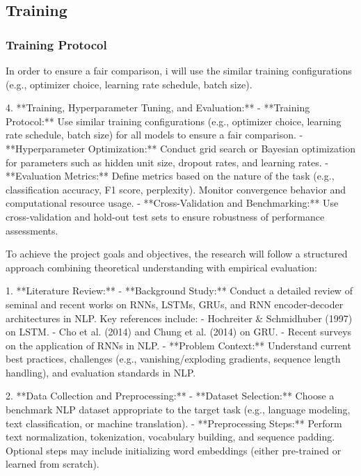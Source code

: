 \documentclass[12pt,a4paper]{article}
\begin{document}
\subsection{Training}
\subsubsection{Training Protocol}
In order to ensure a fair comparison, i will use the similar training configurations (e.g., optimizer choice, learning rate schedule, batch size). 



4. **Training, Hyperparameter Tuning, and Evaluation:**
   - **Training Protocol:**  
     Use similar training configurations (e.g., optimizer choice, learning rate schedule, batch size) for all models to ensure a fair comparison.
   - **Hyperparameter Optimization:**  
     Conduct grid search or Bayesian optimization for parameters such as hidden unit size, dropout rates, and learning rates.
   - **Evaluation Metrics:**  
     Define metrics based on the nature of the task (e.g., classification accuracy, F1 score, perplexity). Monitor convergence behavior and computational resource usage.
   - **Cross-Validation and Benchmarking:**  
     Use cross-validation and hold-out test sets to ensure robustness of performance assessments.



\newpage
To achieve the project goals and objectives, the research will follow a structured approach combining theoretical understanding with empirical evaluation:

1. **Literature Review:**
   - **Background Study:**  
     Conduct a detailed review of seminal and recent works on RNNs, LSTMs, GRUs, and RNN encoder-decoder architectures in NLP. Key references include:
     - Hochreiter \& Schmidhuber (1997) on LSTM.
     - Cho et al. (2014) and Chung et al. (2014) on GRU.
     - Recent surveys on the application of RNNs in NLP.
   - **Problem Context:**  
     Understand current best practices, challenges (e.g., vanishing/exploding gradients, sequence length handling), and evaluation standards in NLP.

2. **Data Collection and Preprocessing:**
   - **Dataset Selection:**  
     Choose a benchmark NLP dataset appropriate to the target task (e.g., language modeling, text classification, or machine translation).
   - **Preprocessing Steps:**  
     Perform text normalization, tokenization, vocabulary building, and sequence padding. Optional steps may include initializing word embeddings (either pre-trained or learned from scratch).
\end{document}
